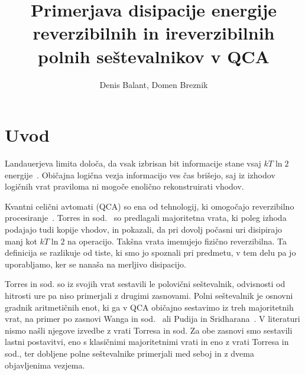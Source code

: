 \graphicspath{{Skupina19/img/}}

\title{Primerjava disipacije energije reverzibilnih in ireverzibilnih polnih seštevalnikov v QCA}
\author{Denis Balant, Domen Breznik}
\maketitle


\section{Uvod}
\label{g19:sec:uvod}

Landauerjeva limita določa, da vsak izbrisan bit informacije stane vsaj $kT\ln 2$ energije~\cite{landauer1961}. Običajna logična vezja informacijo ves čas brišejo, saj iz izhodov logičnih vrat praviloma ni mogoče enolično rekonstruirati vhodov.

Kvantni celični avtomati (QCA) so ena od tehnologij, ki omogočajo reverzibilno procesiranje~\cite{lent1997}. Torres in sod.~\cite{g19:torres2019} so predlagali majoritetna vrata, ki poleg izhoda podajajo tudi kopije vhodov, in pokazali, da pri dovolj počasni uri disipirajo manj kot $kT\ln 2$ na operacijo. Takšna vrata imenujejo fizično reverzibilna. Ta definicija se razlikuje od tiste, ki smo jo spoznali pri predmetu, v tem delu pa jo uporabljamo, ker se nanaša na merljivo disipacijo.

Torres in sod. so iz svojih vrat sestavili le polovični seštevalnik, odvisnosti od hitrosti ure pa niso primerjali z drugimi zasnovami. Polni seštevalnik je osnovni gradnik aritmetičnih enot, ki ga v QCA običajno sestavimo iz treh majoritetnih vrat, na primer po zasnovi Wanga in sod.~\cite{g19:wang2003} ali Pudija in Sridharana~\cite{g19:pudi2012}. V literaturi nismo našli njegove izvedbe z vrati Torresa in sod. Za obe zasnovi smo sestavili lastni postavitvi, eno s klasičnimi majoritetnimi vrati in eno z vrati Torresa in sod., ter dobljene polne seštevalnike primerjali med seboj in z dvema objavljenima vezjema.

